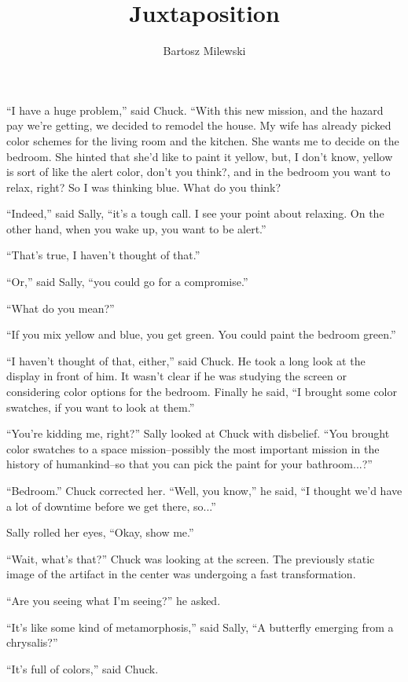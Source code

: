 \documentclass[12pt]{book}
\author{Bartosz Milewski}
\title{Juxtaposition}
\date{}
\begin{document}
\maketitle{}


``I have a huge problem,'' said Chuck. ``With this new mission, and the hazard pay we're getting, we decided to remodel the house. My wife has already picked color schemes for the living room and the kitchen. She wants me to decide on the bedroom. She hinted that she'd like to paint it yellow, but, I don't know, yellow is sort of like the alert color, don't you think?, and in the bedroom you want to relax, right? So I was thinking blue. What do you think?

``Indeed,'' said Sally, ``it's a tough call. I see your point about relaxing. On the other hand, when you wake up, you want to be alert.''

``That's true, I haven't thought of that.''

``Or,'' said Sally, ``you could go for a compromise.''

``What do you mean?''

``If you mix yellow and blue, you get green. You could paint the bedroom green.''

``I haven't thought of that, either,'' said Chuck. He took a long look at the display in front of him. It wasn't clear if he was studying the screen or considering color options for the bedroom. Finally he said, ``I brought some color swatches, if you want to look at them.''

``You're kidding me, right?'' Sally looked at Chuck with disbelief. ``You brought color swatches to a space mission--possibly the most important mission in the history of humankind--so that you can pick the paint for your bathroom...?''

``Bedroom.'' Chuck corrected her. ``Well, you know,'' he said, ``I thought we'd have a lot of downtime before we get there, so...''

Sally rolled her eyes, ``Okay, show me.''

``Wait, what's that?'' Chuck was looking at the screen. The previously static image of the artifact in the center was undergoing a fast transformation. 

``Are you seeing what I'm seeing?'' he asked.

``It's like some kind of metamorphosis,'' said Sally, ``A butterfly emerging from a chrysalis?''

``It's full of colors,'' said Chuck. 
\end{document}

